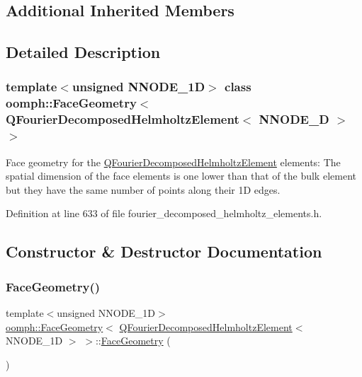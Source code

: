 \subsection*{Additional Inherited Members}


\subsection{Detailed Description}
\subsubsection*{template$<$unsigned N\+N\+O\+D\+E\+\_\+1D$>$\newline
class oomph\+::\+Face\+Geometry$<$ Q\+Fourier\+Decomposed\+Helmholtz\+Element$<$ N\+N\+O\+D\+E\+\_\+D $>$ $>$}

Face geometry for the \hyperlink{classoomph_1_1QFourierDecomposedHelmholtzElement}{Q\+Fourier\+Decomposed\+Helmholtz\+Element} elements\+: The spatial dimension of the face elements is one lower than that of the bulk element but they have the same number of points along their 1D edges. 

Definition at line 633 of file fourier\+\_\+decomposed\+\_\+helmholtz\+\_\+elements.\+h.



\subsection{Constructor \& Destructor Documentation}
\mbox{\label{classoomph_1_1FaceGeometry_3_01QFourierDecomposedHelmholtzElement_3_01NNODE__1D_01_4_01_4_a2e4879990dad5a34d90472e6a224020b}} 
\subsubsection{\texorpdfstring{Face\+Geometry()}{FaceGeometry()}}
{\footnotesize\ttfamily template$<$unsigned N\+N\+O\+D\+E\+\_\+1D$>$ \\
\hyperlink{classoomph_1_1FaceGeometry}{oomph\+::\+Face\+Geometry}$<$ \hyperlink{classoomph_1_1QFourierDecomposedHelmholtzElement}{Q\+Fourier\+Decomposed\+Helmholtz\+Element}$<$ N\+N\+O\+D\+E\+\_\+1D $>$ $>$\+::\hyperlink{classoomph_1_1FaceGeometry}{Face\+Geometry} (\begin{DoxyParamCaption}{ }\end{DoxyParamCaption})\hspace{0.3cm}{\ttfamily [inline]}}



